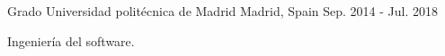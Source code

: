 

\begin{cventries}

  \cventry
  {Grado} %
  {Universidad politécnica de Madrid} %
  {Madrid, Spain} %
  {Sep. 2014 - Jul. 2018} %
  {
    \begin{cvitems} %
      \item {Ingeniería del software.}
    \end{cvitems}
  }

\end{cventries}

